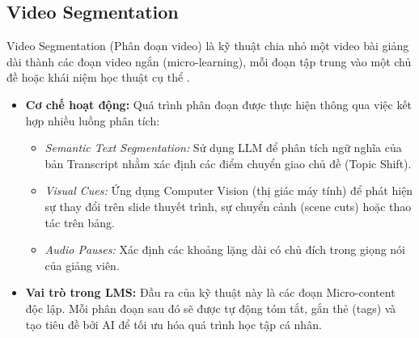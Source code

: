 \subsection{Video Segmentation}
Video Segmentation (Phân đoạn video) là kỹ thuật chia nhỏ một video bài giảng dài thành các đoạn video ngắn (micro-learning), mỗi đoạn tập trung vào một chủ đề hoặc khái niệm học thuật cụ thể \cite{galanopoulos2020lecture}.
\begin{itemize}
    \item \textbf{Cơ chế hoạt động:} Quá trình phân đoạn được thực hiện thông qua việc kết hợp nhiều luồng phân tích:
    \begin{itemize}
        \item \textit{Semantic Text Segmentation:} Sử dụng LLM để phân tích ngữ nghĩa của bản Transcript nhằm xác định các điểm chuyển giao chủ đề (Topic Shift).
        \item \textit{Visual Cues:} Ứng dụng Computer Vision (thị giác máy tính) để phát hiện sự thay đổi trên slide thuyết trình, sự chuyển cảnh (scene cuts) hoặc thao tác trên bảng.
        \item \textit{Audio Pauses:} Xác định các khoảng lặng dài có chủ đích trong giọng nói của giảng viên.
    \end{itemize}
    \item \textbf{Vai trò trong LMS:} Đầu ra của kỹ thuật này là các đoạn Micro-content độc lập. Mỗi phân đoạn sau đó sẽ được tự động tóm tắt, gắn thẻ (tags) và tạo tiêu đề bởi AI để tối ưu hóa quá trình học tập cá nhân.
\end{itemize}

